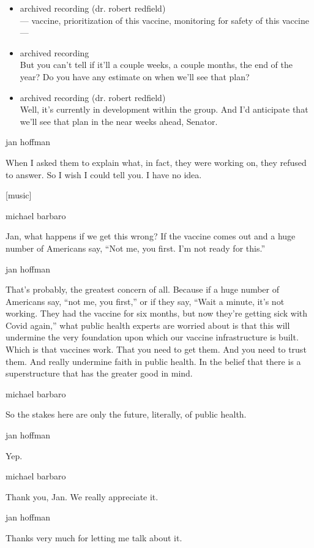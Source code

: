 \begin{itemize}
\item
  archived recording (dr. robert redfield)\\
  --- vaccine, prioritization of this vaccine, monitoring for safety of
  this vaccine ---
\item
  archived recording\\
  But you can't tell if it'll a couple weeks, a couple months, the end
  of the year? Do you have any estimate on when we'll see that plan?
\item
  archived recording (dr. robert redfield)\\
  Well, it's currently in development within the group. And I'd
  anticipate that we'll see that plan in the near weeks ahead, Senator.
\end{itemize}

jan hoffman

When I asked them to explain what, in fact, they were working on, they
refused to answer. So I wish I could tell you. I have no idea.

{[}music{]}

michael barbaro

Jan, what happens if we get this wrong? If the vaccine comes out and a
huge number of Americans say, ``Not me, you first. I'm not ready for
this.''

jan hoffman

That's probably, the greatest concern of all. Because if a huge number
of Americans say, ``not me, you first,'' or if they say, ``Wait a
minute, it's not working. They had the vaccine for six months, but now
they're getting sick with Covid again,'' what public health experts are
worried about is that this will undermine the very foundation upon which
our vaccine infrastructure is built. Which is that vaccines work. That
you need to get them. And you need to trust them. And really undermine
faith in public health. In the belief that there is a superstructure
that has the greater good in mind.

michael barbaro

So the stakes here are only the future, literally, of public health.

jan hoffman

Yep.

michael barbaro

Thank you, Jan. We really appreciate it.

jan hoffman

Thanks very much for letting me talk about it.

